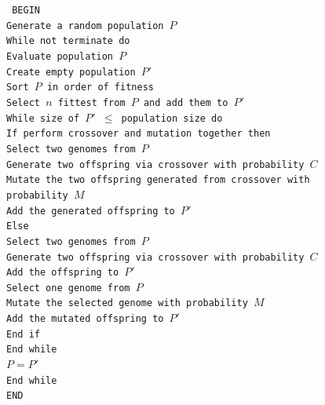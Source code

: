 \renewcommand{\baselinestretch}{1.0}

\begin{figure}[htbp]
\begin{center}
\begin{varwidth}{\textwidth}
{\tt
BEGIN \\
\tab Generate a random population $P$ \\
\tab While not terminate do \\
\tab \tab Evaluate population $P$ \\
\tab \tab Create empty population $P'$ \\
\tab \tab Sort $P$ in order of fitness \\
\tab \tab Select $n$ fittest from $P$ and add them to $P'$ \\
\tab \tab While size of $P'$ $\leq$ population size do \\
\tab \tab \tab If perform crossover and mutation together then \\
\tab \tab \tab \tab Select two genomes from $P$ \\
\tab \tab \tab \tab Generate two offspring via crossover with probability $C$ \\
\tab \tab \tab \tab Mutate the two offspring generated from crossover with probability $M$ \\
\tab \tab \tab \tab Add the generated offspring to $P'$ \\
\tab \tab \tab Else \\
\tab \tab \tab \tab Select two genomes from $P$ \\
\tab \tab \tab \tab Generate two offspring via crossover with probability $C$ \\
\tab \tab \tab \tab Add the offspring to $P'$ \\
\tab \tab \tab \tab Select one genome from $P$ \\
\tab \tab \tab \tab Mutate the selected genome with probability $M$ \\
\tab \tab \tab \tab Add the mutated offspring to $P'$ \\
\tab \tab \tab End if \\
\tab \tab End while \\
\tab \tab $P=P'$ \\
\tab End while \\
END \\
}

\end{varwidth}
\end{center}
\end{figure}
